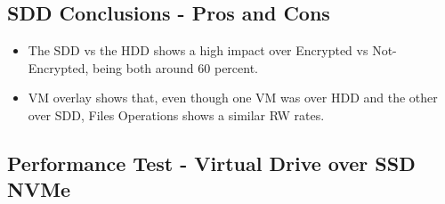 \subsection{SDD Conclusions - Pros and Cons}
\begin{itemize}
  \item The SDD vs the HDD shows a high impact over Encrypted vs Not-Encrypted, being both around 60 percent.
  \item VM overlay shows that, even though one VM was over HDD and the other over SDD, Files Operations shows a similar RW rates.
\end{itemize}

\newpage
\subsection{Performance Test - Virtual Drive over SSD NVMe}
